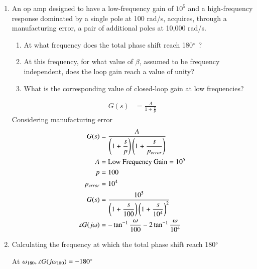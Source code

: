 \begin{enumerate}[label=\thesection.\arabic*.,ref=\thesection.\theenumi]
\item An op amp designed to have a low-frequency gain of $10^{5}$ and a high-frequency response dominated by a single pole at 100 rad/s, acquires, through a manufacturing error, a pair of additional poles at 10,000 rad/s. 
\begin{enumerate}
\item At what frequency does the total phase shift reach 180$\degree$ ? 
\item At this frequency, for what value of $\beta$, assumed to be frequency independent, does the loop gain reach a value of unity? 
\item What is the corresponding value of closed-loop gain at low frequencies?
\end{enumerate}
\solution
\begin{align}
G(s) &= \frac{A}{1+\frac{s}{p}} 
\end{align}
Considering manufacturing error
\begin{align}
G(s) &= \dfrac{A}{\left(1+\dfrac{s}{p}\right)\left(1+\dfrac{s}{p_{error}}\right)} 
\\
A &= \text{Low Frequency Gain} = 10^{5}
\\
p &= 100
\\
p_{error} &= 10^{4}
\\
G(s) &= \dfrac{10^{5}}{\left(1+\dfrac{s}{100}\right)\left(1+\dfrac{s}{10^{4}}\right)^{2}}
\\
\measuredangle G(j\omega) &= -\tan^{-1}\frac{\omega}{100} - 2\tan^{-1}\frac{\omega}{10^{4}}
\end{align}
\item Calculating the frequency at which the total phase shift reach 180$\degree$ 

At $\omega_{180}, \measuredangle G(j\omega_{180}) = -180\degree$


\end{enumerate}
